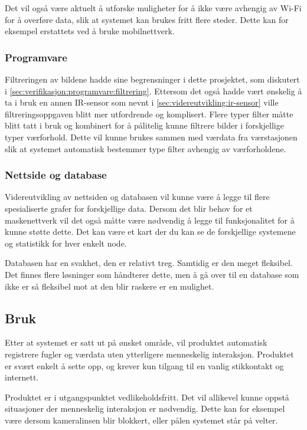 Det vil også være aktuelt å utforske muligheter for å ikke være avhengig av Wi-Fi for å overføre data, slik at systemet kan brukes fritt flere steder. Dette kan for eksempel erstattets ved å bruke mobilnettverk.

\subsubsection{Programvare}\label{sec:videreutvikling:programvare}


Filtreringen av bildene hadde sine begrensninger i dette prosjektet, som diskutert i \autoref{sec:verifikasjon:programvare:filtrering}. Ettersom det også hadde vært ønskelig å ta i bruk en annen IR-sensor som nevnt i \autoref{sec:videreutvikling:ir-sensor} ville filtreringsoppgaven blitt mer utfordrende og komplisert. Flere typer filter måtte blitt tatt i bruk og kombinert for å pålitelig kunne filtrere bilder i forskjellige typer værforhold. Dette vil kunne brukes sammen med værdata fra værstasjonen slik at systemet automatisk bestemmer type filter avhengig av værforholdene. 



\subsubsection{Nettside og database}

Videreutvikling av nettsiden og databasen vil kunne være å legge til flere spesialiserte grafer for forskjellige data. 
Dersom det blir behov for et maskenettverk vil det også måtte være nødvendig å legge til funksjonalitet for å kunne støtte dette. 
Det kan være et kart der du kan se de forskjellige systemene og statistikk for hver enkelt node. 

Databasen har en svakhet, den er relativt treg. Samtidig er den meget fleksibel. 
Det finnes flere løsninger som håndterer dette, men å gå over til en database som ikke er så fleksibel mot at den blir raskere er en mulighet. 


\subsection{Bruk}

Etter at systemet er satt ut på ønsket område, vil produktet automatisk registrere fugler og værdata uten ytterligere menneskelig interaksjon. 
Produktet er svært enkelt å sette opp, og krever kun tilgang til en vanlig stikkontakt og internett. 

Produktet er i utgangspunktet vedlikeholdsfritt.
Det vil allikevel kunne oppstå situasjoner der menneskelig interaksjon er nødvendig. 
Dette kan for eksempel være dersom kameralinsen blir blokkert, eller pålen systemet står på velter. 

